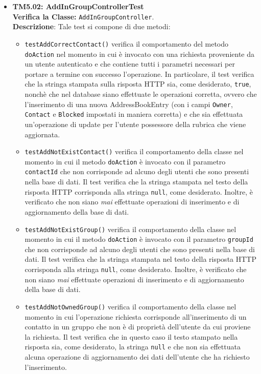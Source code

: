 \begin{itemize}
\item \textbf{TM5.02: AddInGroupControllerTest}\\
\textbf{Verifica la Classe:} \texttt{AddInGroupController}.\\
\textbf{Descrizione}: %
Tale test si compone di due metodi: 
\begin{itemize}
\item \texttt{testAddCorrectContact()} verifica il comportamento del metodo \texttt{doAction} nel momento in cui è invocato con una richiesta proveniente da un utente autenticato e che contiene tutti i parametri necessari per portare a termine con successo l'operazione. In particolare, il test verifica che la stringa stampata sulla risposta HTTP sia, come desiderato, \texttt{true}, nonchè che nel database siano effettuate le operazioni corretta, ovvero che l'inserimento di una nuova AddressBookEntry (con i campi \texttt{Owner}, \texttt{Contact} e \texttt{Blocked} impostati in maniera corretta) e che sia effettuata un'operazione di update per l'utente possessore della rubrica che viene aggiornata.

\item \texttt{testAddNotExistContact()} verifica il comportamento della classe nel momento in cui il metodo \texttt{doAction} è invocato con il parametro \texttt{contactId} che non corrisponde ad alcuno degli utenti che sono presenti nella base di dati. Il test verifica che la stringa stampata nel testo della risposta HTTP corrisponda alla stringa \texttt{null}, come desiderato. Inoltre, è verificato che non siano \textit{mai} effettuate operazioni di inserimento e di aggiornamento della base di dati.

\item \texttt{testAddNotExistGroup()} verifica il comportamento della classe nel momento in cui il metodo \texttt{doAction} è invocato con il parametro \texttt{groupId} che non corrisponde ad alcuno degli utenti che sono presenti nella base di dati. Il test verifica che la stringa stampata nel testo della risposta HTTP corrisponda alla stringa \texttt{null}, come desiderato. Inoltre, è verificato che non siano \textit{mai} effettuate operazioni di inserimento e di aggiornamento della base di dati.

\item \texttt{testAddNotOwnedGroup()} verifica il comportamento della classe nel momento in cui l'operazione richiesta corrisponde all'inserimento di un contatto in un gruppo che non è di proprietà dell'utente da cui proviene la richiesta. Il test verifica che in questo caso il testo stampato nella risposta sia, come desiderato, la stringa \texttt{null} e che non sia effettuata alcuna operazione di aggiornamento dei dati dell'utente che ha richiesto l'inserimento.


\end{itemize}
\end{itemize}
